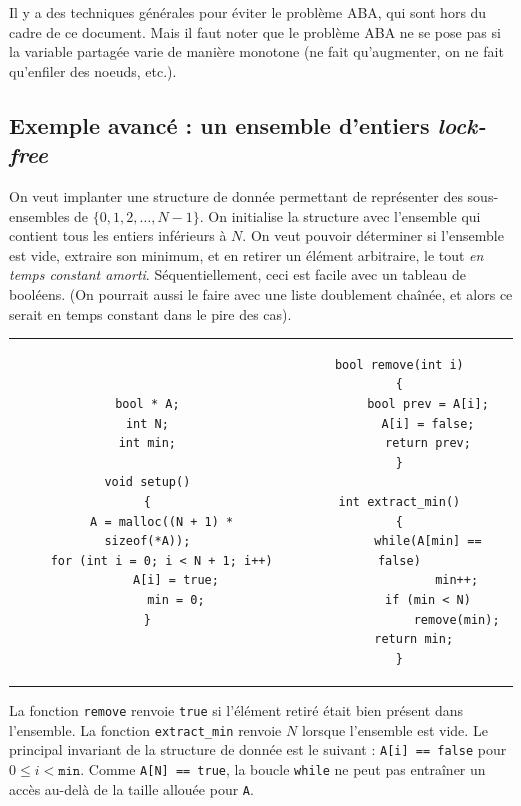 Il y a des techniques générales pour éviter le problème ABA, qui sont hors du
cadre de ce document. Mais il faut noter que le problème ABA ne se pose pas si
la variable partagée varie de manière monotone (ne fait qu'augmenter, on ne fait
qu'enfiler des noeuds, etc.).

\subsection{Exemple avancé : un ensemble d'entiers \emph{lock-free}}

On veut implanter une structure de donnée permettant de représenter des
sous-ensembles de $\{0, 1, 2, \dots, N-1\}$. On initialise la structure avec
l'ensemble qui contient tous les entiers inférieurs à $N$. On veut pouvoir
déterminer si l'ensemble est vide, extraire son minimum, et en retirer un
élément arbitraire, le tout \emph{en temps constant amorti}. Séquentiellement,
ceci est facile avec un tableau de booléens. (On pourrait aussi le faire avec
une liste doublement chaînée, et alors ce serait en temps constant dans le pire
des cas).

\begin{tabular}{c|c}
\begin{minipage}[t]{0.5\textwidth}
\begin{verbatim}
bool * A;
int N;
int min;

void setup()
{
	A = malloc((N + 1) * sizeof(*A));
	for (int i = 0; i < N + 1; i++)
		A[i] = true;
        min = 0;
}
\end{verbatim}
\end{minipage}
  &
\begin{minipage}[t]{0.6\textwidth}
\begin{verbatim}
bool remove(int i)
{
        bool prev = A[i];
        A[i] = false;
        return prev;
}

int extract_min()
{
        while(A[min] == false)
                min++;
        if (min < N)
                remove(min);
	return min;
}
\end{verbatim}
\end{minipage}
\end{tabular}

\medskip

La fonction \texttt{remove} renvoie \texttt{true} si l'élément retiré était bien
présent dans l'ensemble. La fonction \texttt{extract\_min} renvoie $N$ lorsque
l'ensemble est vide. Le principal invariant de la structure de donnée est le
suivant : \texttt{A[i] == false} pour $0 \leq i < \texttt{min}$. Comme
\texttt{A[N] == true}, la boucle \texttt{while} ne peut pas entraîner un accès
au-delà de la taille allouée pour \texttt{A}.

